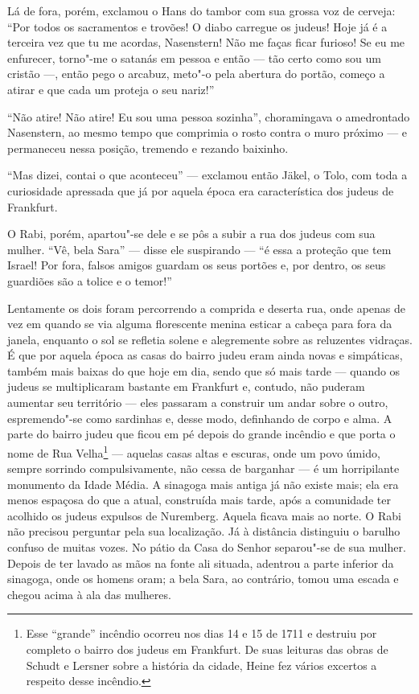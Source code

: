 Lá de fora, porém, exclamou o Hans do tambor com sua grossa voz de
cerveja: ``Por todos os sacramentos e trovões! O diabo carregue os
judeus! Hoje já é a terceira vez que tu me acordas, Nasenstern! Não me
faças ficar furioso! Se eu me enfurecer, torno"-me o satanás em pessoa
e então --- tão certo como sou um cristão ---, então pego o arcabuz,
meto"-o pela abertura do portão, começo a atirar e que cada um proteja
o seu nariz!''

``Não atire! Não atire! Eu sou uma pessoa sozinha'', choramingava o
amedrontado Nasenstern, ao mesmo tempo que comprimia o rosto contra o
muro próximo --- e permaneceu nessa posição, tremendo e rezando baixinho.

``Mas dizei, contai o que aconteceu'' --- exclamou então Jäkel, o Tolo, com
toda a curiosidade apressada que já por aquela época era característica
dos judeus de Frankfurt.

O Rabi, porém, apartou"-se dele e se pôs a subir a rua dos judeus com
sua mulher. ``Vê, bela Sara'' --- disse ele suspirando --- ``é essa a proteção
que tem Israel! Por fora, falsos amigos guardam os seus portões e, por
dentro, os seus guardiões são a tolice e o temor!''

Lentamente os dois foram percorrendo a comprida e deserta rua, onde
apenas de vez em quando se via alguma florescente menina esticar a
cabeça para fora da janela, enquanto o sol se refletia solene e
alegremente sobre as reluzentes vidraças. É que por aquela época as
casas do bairro judeu eram ainda novas e simpáticas, também mais baixas
do que hoje em dia, sendo que só mais tarde --- quando os judeus se
multiplicaram bastante em Frankfurt e, contudo, não puderam aumentar
seu território --- eles passaram a construir um andar sobre o outro,
espremendo"-se como sardinhas e, desse modo, definhando de corpo e
alma. A parte do bairro judeu que ficou em pé depois do grande incêndio
e que porta o nome de Rua
Velha\footnote{ Esse
``grande'' incêndio ocorreu nos dias 14 e 15 de 1711 e destruiu por
completo o bairro dos judeus em Frankfurt. De suas leituras das obras
de Schudt e Lersner sobre a história da cidade, Heine fez vários
excertos a respeito desse incêndio.}
 --- aquelas casas altas e escuras, onde um povo úmido, sempre sorrindo
compulsivamente, não cessa de barganhar --- é um horripilante monumento
da Idade Média. A sinagoga mais antiga já não existe mais; ela era
menos espaçosa do que a atual, construída mais tarde, após a comunidade
ter acolhido os judeus expulsos de Nuremberg. Aquela ficava mais ao
norte. O Rabi não precisou perguntar pela sua localização. Já à
distância distinguiu o barulho confuso de muitas vozes. No pátio da
Casa do Senhor separou"-se de sua mulher. Depois de ter lavado as mãos
na fonte ali situada, adentrou a parte inferior da sinagoga, onde os
homens oram; a bela Sara, ao contrário, tomou uma escada e chegou acima
à ala das mulheres.

